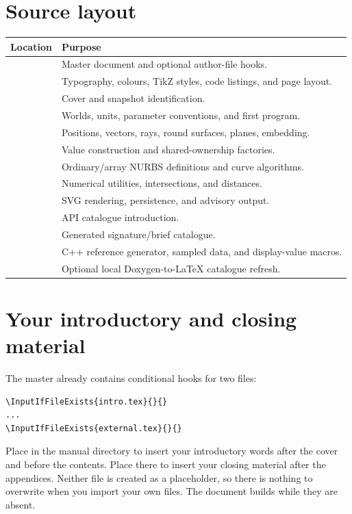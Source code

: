\section{Source layout}
\begin{tabularx}{\linewidth}{@{}lY@{}}
\toprule
Location & Purpose\\
\midrule
{} & Master document and optional author-file hooks.\\
 & Typography, colours, TikZ styles, code listings, and page layout.\\
 & Cover and snapshot identification.\\
 & Worlds, units, parameter conventions, and first program.\\
 & Positions, vectors, rays, round surfaces, planes, embedding.\\
 & Value construction and shared-ownership factories.\\
 & Ordinary/array NURBS definitions and curve algorithms.\\
 & Numerical utilities, intersections, and distances.\\
 & SVG rendering, persistence, and advisory output.\\
 & API catalogue introduction.\\
 & Generated signature/brief catalogue.\\
 & C++ reference generator, sampled data, and display-value macros.\\
 & Optional local Doxygen-to-LaTeX catalogue refresh.\\
\bottomrule
\end{tabularx}

\section{Your introductory and closing material}
The master already contains conditional hooks for two files:
\begin{lstlisting}[style=plain]
\InputIfFileExists{intro.tex}{}{}
...
\InputIfFileExists{external.tex}{}{}
\end{lstlisting}
Place  in the manual directory to insert your introductory
words after the cover and before the contents. Place  there
to insert your closing material after the appendices. Neither file is created
as a placeholder, so there is nothing to overwrite when you import your own
files. The document builds while they are absent.

